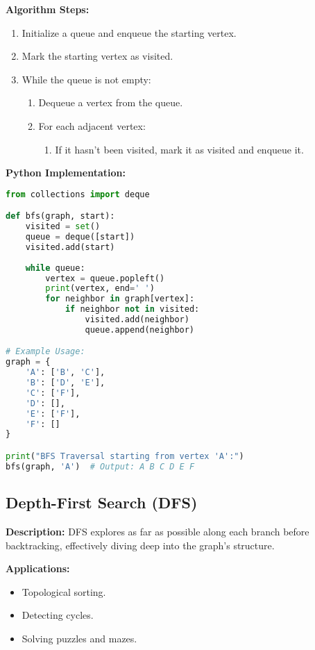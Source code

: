 \textbf{Algorithm Steps:}
\begin{enumerate}
    \item Initialize a queue and enqueue the starting vertex.
    \item Mark the starting vertex as visited.
    \item While the queue is not empty:
    \begin{enumerate}
        \item Dequeue a vertex from the queue.
        \item For each adjacent vertex:
        \begin{enumerate}
            \item If it hasn't been visited, mark it as visited and enqueue it.
        \end{enumerate}
    \end{enumerate}
\end{enumerate}

\textbf{Python Implementation:}

\begin{lstlisting}[language=Python, xleftmargin=0.02\textwidth, xrightmargin=0.02\textwidth]
from collections import deque

def bfs(graph, start):
    visited = set()
    queue = deque([start])
    visited.add(start)
    
    while queue:
        vertex = queue.popleft()
        print(vertex, end=' ')
        for neighbor in graph[vertex]:
            if neighbor not in visited:
                visited.add(neighbor)
                queue.append(neighbor)

# Example Usage:
graph = {
    'A': ['B', 'C'],
    'B': ['D', 'E'],
    'C': ['F'],
    'D': [],
    'E': ['F'],
    'F': []
}

print("BFS Traversal starting from vertex 'A':")
bfs(graph, 'A')  # Output: A B C D E F 
\end{lstlisting}

\subsection{Depth-First Search (DFS)}

\textbf{Description:}  
DFS explores as far as possible along each branch before backtracking, effectively diving deep into the graph's structure.

\textbf{Applications:}
\begin{itemize}
    \item Topological sorting.
    \item Detecting cycles.
    \item Solving puzzles and mazes.
\end{itemize}

